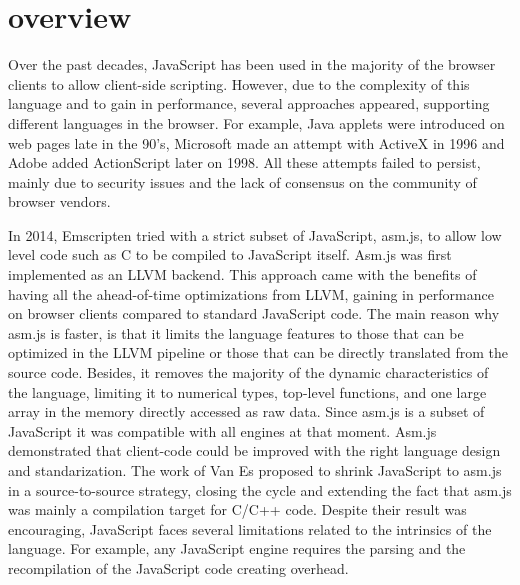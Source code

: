 \section{\wasm overview}
\label{sota:wasm}

\newcommand{\lstnumberautorefname}{Line}
\newcommand{\lineref}[1]{\autoref{#1}}



Over the past decades, JavaScript has been used in the majority of the browser clients to allow client-side scripting. However, due to the complexity of this language and to gain in performance, several approaches appeared, supporting different languages in the browser.  For example, Java applets were introduced on web pages late in the 90's, Microsoft made an attempt with ActiveX in 1996  and Adobe added ActionScript later on 1998. All these attempts failed to persist, mainly due to security issues and the lack of consensus on the community of browser vendors. 

In 2014, Emscripten tried with a strict subset of JavaScript, asm.js, to allow low level code such as C to be compiled to JavaScript itself. Asm.js was first implemented as an LLVM backend. This approach came with the benefits of having all the ahead-of-time optimizations from LLVM, gaining in performance on browser clients \cite{asmjs} compared to standard JavaScript code. The main reason why asm.js is faster, is that it limits the language features to those that can be optimized in the LLVM pipeline or those that can be directly translated from the source code. Besides, it removes the majority of the dynamic characteristics of the language, limiting it to numerical types, top-level functions, and one large array in the memory directly accessed as raw data. Since asm.js is a subset of JavaScript it was compatible with all engines at that moment. Asm.js demonstrated that client-code could be improved with the right language design and standarization.
The work of Van Es \etal \cite{EsAsm.js} proposed to shrink JavaScript to asm.js in a source-to-source strategy, closing the cycle and extending the fact that asm.js was mainly a compilation target for C/C++ code. Despite their result was encouraging, JavaScript faces several limitations related to the intrinsics of the language. For example, any JavaScript engine requires the parsing and the recompilation of the JavaScript code creating overhead.

